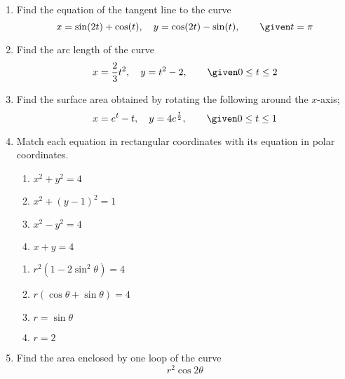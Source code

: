 \begin{enumerate}
\newpage %

  \item Find the equation of the tangent line to the curve
    \[%
    x = \sin (2t) + \cos (t), \quad y = \cos (2t) - \sin (t), \qquad \given t
    = \pi
    \]%

\newpage %

\item Find the arc length of the curve
  \[%
  x = \frac{2}{3}t^2, \quad y = t^2 - 2, \qquad \given 0 \leq t \leq 2
  \]%


\newpage %

  \item Find the surface area obtained by rotating the following around the
    \(x\)-axis;
    \[%
    x = e^t - t, \quad y = 4e^{\frac{t}{2}}, \qquad \given 0 \leq t \leq 1
    \]%


\newpage %

  \item Match each equation in rectangular coordinates with its equation in
    polar coordinates.

  \begin{multicols}{2}
    \begin{enumerate}
      \item \(x^2 + y^2 = 4\)
      \item \(x^2 + (y-1)^2 = 1\)
      \item \(x^2 - y^2 = 4\)
      \item \(x + y = 4\)
    \end{enumerate}

    \begin{enumerate}[label=(\roman*)]
      \item \(r^2 (1- 2 \sin ^2 \theta) = 4\)
      \item \(r (\cos \theta + \sin \theta ) = 4\)
      \item \(r = \sin \theta\)
      \item \(r = 2 \)
    \end{enumerate}
  \end{multicols}

  \vspace{8em}

  \item Find the area enclosed by one loop of the curve
    \[%
    r^2 \cos 2\theta
    \]%

\end{enumerate}
